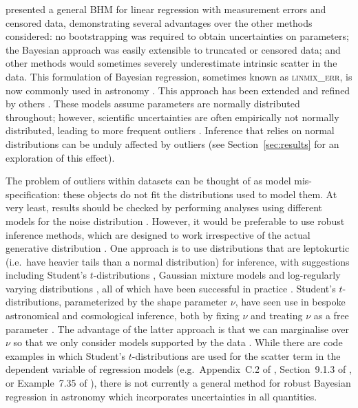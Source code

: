 \documentclass[fleqn,usenatbib]{rasti}
\begin{document}
\citet{Kelly:2007} presented a general BHM for linear regression with
measurement errors and censored data, demonstrating  several advantages over the
other methods considered: no bootstrapping was required to obtain uncertainties
on parameters; the Bayesian approach was easily extensible to truncated or
censored data; and other methods would sometimes severely underestimate
intrinsic scatter in the data. This formulation of Bayesian regression,
sometimes known as \textsc{linmix\_err}, is now commonly used in astronomy
\citep[e.g.][]{McConnell:2013, Bentz:2013, Andrews:2013}. This approach has been
extended and refined by others \citep[e.g.][]{Mantz:2016, Sereno:2016,
Bartlett:2023, Jing:2024}. These
models assume parameters are normally distributed throughout; however,
scientific uncertainties are often empirically not normally distributed, leading
to more frequent outliers \citep{Bailey:2017}. Inference that relies on normal
distributions can be unduly affected by outliers (see Section~\ref{sec:results}
for an exploration of this effect).

The problem of outliers within datasets can be thought of as model
mis-specification: these objects do not fit the distributions used to model
them. At very least, results should be checked by performing analyses using
different models for the noise distribution \citep[e.g.][]{Andreon:2015,
McElreath:2020}. However, it would be preferable to use robust inference
methods, which are designed to work irrespective of the actual generative
distribution \citep{Berger:1994}. One approach is to use distributions that are
leptokurtic (i.e.\ have heavier tails than a normal distribution) for inference,
with suggestions including Student's $t$-distributions \citep{Andrews:1974},
Gaussian mixture models \citep{Box:1968, Aitkin:1980} and log-regularly varying
distributions \citep[LRVD;][]{Gagnon:2020, Hamura:2022}, all of which have been
successful in practice \citep[e.g.][]{Berger:1994, Sivia:2006, Gelman:2013,
Gagnon:2023, Hamura:2024}.  Student's $t$-distributions, parameterized by the
shape parameter $\nu$, have seen use in bespoke astronomical and cosmological
inference, both by fixing $\nu$ \citep[e.g.][]{Andreon:2008, Jontof-Hutter:2016,
Andreon:2020} and treating $\nu$ as a free parameter \citep[e.g.][]{Park:2017,
Feeney:2018}. The advantage of the latter approach is that we can marginalise
over $\nu$ so that we only consider models supported by the data
\citep{Gelman:2013}.  While there are code examples in which Student's
$t$-distributions are used for the scatter term in the dependent variable of
regression models (e.g.\ Appendix~C.2 of \citealt{Gelman:2013}, Section~9.1.3 of
\citealt{Andreon:2015}, or Example~7.35 of \citealt{McElreath:2020}), there is
not currently a general method for robust Bayesian regression in astronomy which
incorporates uncertainties in all quantities.
\end{document}
